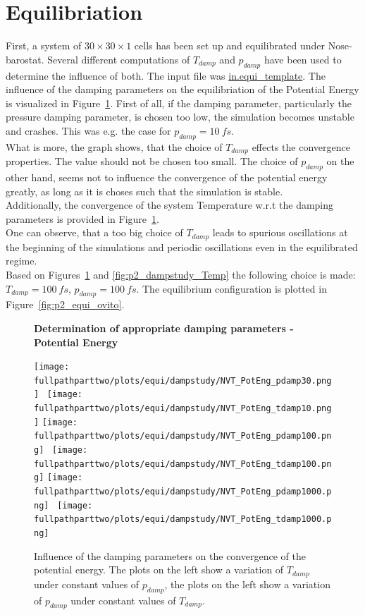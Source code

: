 \documentclass[10pt,a4paper]{report}
\def \pathparttwo {../../2_Two-dimensional_atomic_tensile_test}
\def \fullpathparttwo {/home/lukas/Desktop/project/independence/atomistic_modeling/exam/2_Two-dimensional_atomic_tensile_test}
\newcommand*{\figuretitle}[1]{%
    {\centering%
    \textbf{#1}%
    \par\medskip}%
}
\begin{document}
\section{Equilibriation}
First, a system of $30\times30\times1$ cells has been set up and equilibrated under Nose-barostat. Several different computations of $T_{damp}$ and $p_{damp}$ have been used to determine the influence of both. The input file was \href{\pathparttwo\in.equi_template}{in.equi\_template}.
The influence of the damping parameters on the equilibriation of the Potential Energy is visualized in Figure~\ref{fig:p2_dampstudy_PotEng}.
First of all, if the damping parameter, particularly the pressure damping parameter, is chosen too low, the simulation becomes unstable and crashes. This was e.g. the case for $p_{damp}=10~fs$.\\
What is more, the graph shows, that the choice of $T_{damp}$ effects the convergence properties. The value should not be chosen too small. The choice of $p_{damp}$ on the other hand, seems not to influence the convergence of the potential energy greatly, as long as it is choses such that the simulation is stable.\\
Additionally, the convergence of the system Temperature w.r.t the damping parameters is provided in Figure~\ref{fig:p2_dampstudy_PotEng}.\\
One can observe, that a too big choice of $T_{damp}$ leads to spurious oscillations at the beginning of the simulations and periodic oscillations even in the equilibrated regime.\\

Based on Figures~\ref{fig:p2_dampstudy_PotEng} and \ref{fig:p2_dampstudy_Temp} the following choice is made: $T_{damp}=100~fs$, $p_{damp}=100~fs$.
The equilibrium configuration is plotted in Figure~\ref{fig:p2_equi_ovito}.

\begin{center}
\begin{figure}[h]
\figuretitle{Determination of appropriate damping parameters - Potential Energy}
\texttt{[image: \\fullpathparttwo/plots/equi/dampstudy/NVT\_PotEng\_pdamp30.png]}~
\texttt{[image: \\fullpathparttwo/plots/equi/dampstudy/NVT\_PotEng\_tdamp10.png]}
\texttt{[image: \\fullpathparttwo/plots/equi/dampstudy/NVT\_PotEng\_pdamp100.png]}~
\texttt{[image: \\fullpathparttwo/plots/equi/dampstudy/NVT\_PotEng\_tdamp100.png]}
\texttt{[image: \\fullpathparttwo/plots/equi/dampstudy/NVT\_PotEng\_pdamp1000.png]}~
\texttt{[image: \\fullpathparttwo/plots/equi/dampstudy/NVT\_PotEng\_tdamp1000.png]}
\caption[Determination of appropriate damping parameters - Potential Energy]{Influence of the damping parameters on the convergence of the potential energy. The plots on the left show a variation of $T_{damp}$ under constant values of $p_{damp}$, the plots on the left show a variation of $p_{damp}$ under constant values of $T_{damp}$.}
\label{fig:p2_dampstudy_PotEng}
\end{figure}
\end{center}
\end{document}
